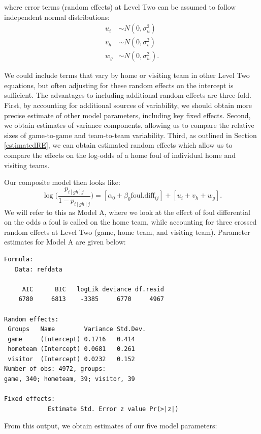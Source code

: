 \documentclass[
]{krantz}
\begin{document}
where error terms (random effects) at Level Two can be assumed to follow independent normal distributions:
\begin{align*}
u_{i} & \sim N \left( 0 , \sigma_{u}^{2} \right) \\
v_{h} & \sim N \left( 0 , \sigma_{v}^{2} \right) \\
w_{g} & \sim N \left( 0 , \sigma_{w}^{2} \right).
\end{align*}

We could include terms that vary by home or visiting team in other Level Two equations, but often adjusting for these random effects on the intercept is sufficient. The advantages to including additional random effects are three-fold. First, by accounting for additional sources of variability, we should obtain more precise estimate of other model parameters, including key fixed effects. Second, we obtain estimates of variance components, allowing us to compare the relative sizes of game-to-game and team-to-team variability. Third, as outlined in Section \ref{estimatedRE}, we can obtain estimated random effects which allow us to compare the effects on the log-odds of a home foul of individual home and visiting teams.

Our composite model then looks like:
\begin{equation}
\log\bigg(\frac{p_{i[gh]j}}{1-p_{i[gh]j}}\bigg) = [\alpha_{0}+\beta_{0}\mathrm{foul.diff}_{ij}]+[u_{i}+v_{h}+w_{g}].
\label{eq:compmoda}
\end{equation}
We will refer to this as Model A, where we look at the effect of foul differential on the odds a foul is called on the home team, while accounting for three crossed random effects at Level Two (game, home team, and visiting team). Parameter estimates for Model A are given below:

\begin{verbatim}
Formula: 
   Data: refdata

     AIC      BIC   logLik deviance df.resid 
    6780     6813    -3385     6770     4967 

Random effects:
 Groups   Name        Variance Std.Dev.
 game     (Intercept) 0.1716   0.414   
 hometeam (Intercept) 0.0681   0.261   
 visitor  (Intercept) 0.0232   0.152   
Number of obs: 4972, groups:  
game, 340; hometeam, 39; visitor, 39

Fixed effects:
            Estimate Std. Error z value Pr(>|z|)    
\end{verbatim}

From this output, we obtain estimates of our five model parameters:
\end{document}
